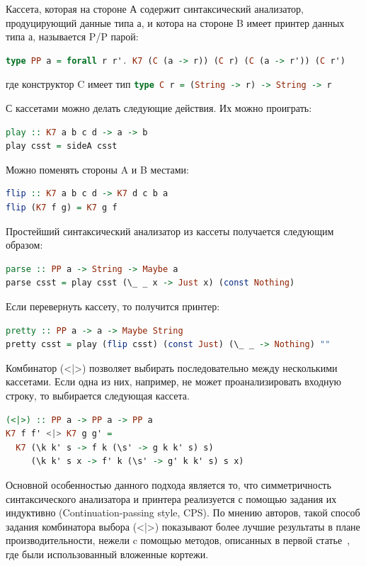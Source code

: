 \documentclass{matmex-diploma-custom}
\begin{document}
Кассета, которая на стороне А содержит синтаксический анализатор, продуцирующий данные типа а, и котора на стороне B имеет принтер данных типа а, называется P/P парой:
\begin{lstlisting}[mathescape,language = haskell]
type PP a = forall r r'. K7 (C (a -> r)) (C r) (C (a -> r')) (C r')
\end{lstlisting}
где конструктор C имеет тип \lstinline[language=haskell]{type C r = (String -> r) -> String -> r}

С кассетами можно делать следующие действия. Их можно проиграть:
\begin{lstlisting}[mathescape,language = haskell]
play :: K7 a b c d -> a -> b
play csst = sideA csst
\end{lstlisting}
Можно поменять стороны A и B местами:
\begin{lstlisting}[mathescape,language = haskell]
flip :: K7 a b c d -> K7 d c b a
flip (K7 f g) = K7 g f
\end{lstlisting}

Простейший синтаксический анализатор из кассеты получается следующим образом:
\begin{lstlisting}[mathescape,language = haskell]
parse :: PP a -> String -> Maybe a
parse csst = play csst (\_ _ x -> Just x) (const Nothing)
\end{lstlisting}

Если перевернуть кассету, то получится принтер:
\begin{lstlisting}[mathescape,language = haskell]
pretty :: PP a -> a -> Maybe String
pretty csst = play (flip csst) (const Just) (\_ _ -> Nothing) ""
\end{lstlisting}

Комбинатор (<|>) позволяет выбирать последовательно между несколькими кассетами. Если одна из них, например, не может проанализировать входную строку, то выбирается следующая кассета.
\begin{lstlisting}[mathescape,language = haskell]
(<|>) :: PP a -> PP a -> PP a
K7 f f' <|> K7 g g' =
  K7 (\k k' s -> f k (\s' -> g k k' s) s)
     (\k k' s x -> f' k (\s' -> g' k k' s) s x)
\end{lstlisting}

Основной особенностью данного подхода является то, что симметричность синтаксического анализатора и принтера реализуется с помощью задания их индуктивно (Continuation-passing style, CPS). По мнению авторов, такой способ задания комбинатора выбора (<|>) показывают более лучшие результаты в плане производительности, нежели c помощью методов, описанных в первой статье~\cite{Rendel}, где были использованный вложенные кортежи. 
\end{document}
